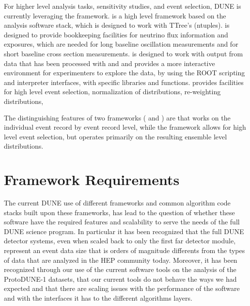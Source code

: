 \documentclass[../main-v1.tex]{subfiles}
\begin{document}
For higher level analysis tasks, sensitivity studies, and event selection, DUNE is currently leveraging the  framework.   is a high level framework based on the  analysis software stack, which is designed to work with  TTree's (ntuples).   is designed to provide bookkeeping facilities for neutrino flux information and exposures, which are needed for long baseline oscillation measurements and for short baseline cross section measurements.   is designed to work with output from data that has been processed with  and  and provides a more interactive environment for experimenters to explore the data, by using the ROOT scripting and interpreter interfaces, with specific  libraries and functions.   provides facilities for high level event selection, normalization of distributions, re-weighting distributions,  

The distinguishing features of two frameworks ( and ) are that  works on the individual event record by event record level, while the  framework allows for high level event selection, but operates primarily on the resulting ensemble level distributions.  

\section{Framework Requirements }

The current DUNE use of different frameworks and common algorithm code stacks built upon these frameworks, has lead to the question of whether these software have the required features and scalability to serve the needs of the full DUNE science program.  In particular it has been recognized that the full DUNE detector systems, even when scaled back to only the first far detector module, represent an event data size that is orders of magnitude differents from the types of data that are analyzed in the HEP community today.  Moreover, it has been recognized through our use of the current software tools on the analysis of the ProtoDUNE-1 datasets, that our current tools do not behave the ways we had expected and that there are scaling issues with the performance of the software and with the interfaces it has to the different algorithms layers.
\end{document}
